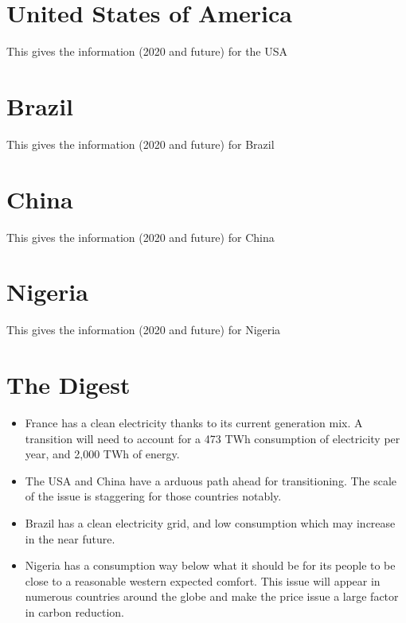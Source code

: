 \section{United States of America}

This gives the information (2020 and future) for the USA

\section{Brazil}

This gives the information (2020 and future) for Brazil

\section{China}

This gives the information (2020 and future) for China

\section{Nigeria}

This gives the information (2020 and future) for Nigeria


\section{The Digest}


\begin{kaoboxgreen}[frametitle=Main Takeaways]

\begin{itemize}
\item France has a clean electricity thanks to its current generation mix. A transition will need to account for a 473 TWh consumption of electricity per year, and 2,000 TWh of energy.
\item The USA and China have a arduous path ahead for transitioning. The scale of the issue is staggering for those countries notably.
\item Brazil has a clean electricity grid, and low consumption which may increase in the near future.
\item Nigeria has a consumption way below what it should be for its people to be close to a reasonable western expected comfort. This issue will appear in numerous countries around the globe and make the price issue a large factor in carbon reduction.
\end{itemize}
  
\end{kaoboxgreen}